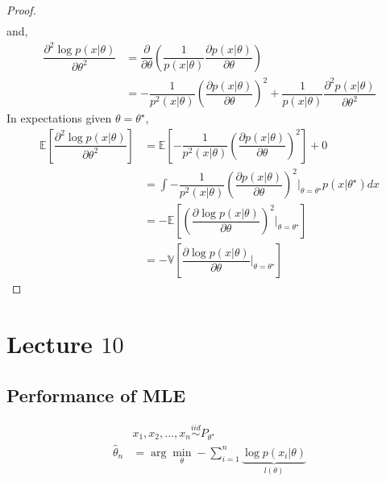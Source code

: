 \documentclass{article}
\begin{document}
\begin{proof}
\begin{align*}
\end{align*}
and,
\begin{align*}
\dfrac{\partial^2 \log p\left(x | \theta\right)}{\partial \theta^2} &= \dfrac{\partial }{\partial \theta} \left(\dfrac{1}{p\left(x | \theta\right)} \dfrac{\partial p\left(x | \theta\right)}{\partial \theta}\right)
\\ &= - \dfrac{1}{p^{2}\left(x | \theta\right)} \left(\dfrac{\partial p\left(x | \theta\right)}{\partial \theta}\right)^{2} + \dfrac{1}{p\left(x | \theta\right)} \dfrac{\partial^2 p\left(x | \theta\right)}{\partial \theta^2}
\end{align*}
In expectations given $\theta = \theta^\star $,
\begin{align*}
\mathbb{E}\left[\dfrac{\partial^2 \log p\left(x | \theta\right)}{\partial \theta^2} \right] &= \mathbb{E}\left[- \dfrac{1}{p^{2}\left(x | \theta\right)} \left(\dfrac{\partial p\left(x | \theta\right)}{\partial \theta}\right)^{2} \right] + 0
\\ &= \displaystyle\int - \dfrac{1}{p^{2}\left(x | \theta\right)} \left(\dfrac{\partial p\left(x | \theta\right)}{\partial \theta}\right)^{2} \bigg|_{\theta = \theta^\star } p\left(x | \theta^\star \right) dx
\\ &= - \mathbb{E}\left[\left(\dfrac{\partial \log p\left(x | \theta\right)}{\partial \theta}\right)^{2} \bigg|_{\theta = \theta^\star }\right]
\\ &= - \mathbb{V}\left[\dfrac{\partial \log p\left(x | \theta\right)}{\partial \theta} \bigg|_{\theta = \theta^\star }\right]
\end{align*}\end{proof}





\section{Lecture $10$} 


\subsection{Performance of MLE}
\begin{align*}
&  x_{1}, x_{2}, ..., x_{n} \stackrel{iid}{\sim} P_{\theta^\star }
\\ \hat{\theta}_{n} &= \arg\displaystyle\min_{\theta} - \displaystyle\sum_{i=1}^{n} \underbrace{\log p\left(x_{i} | \theta\right)}_{l\left(\theta\right)}
\end{align*}
\end{document}
